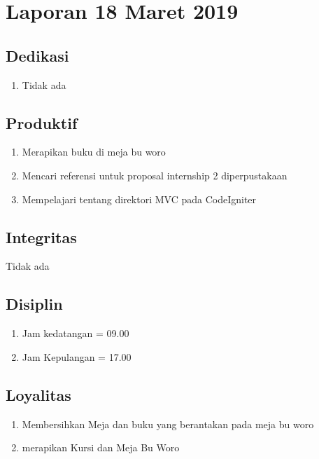 \section{Laporan 18 Maret 2019}
\subsection{Dedikasi}
\begin{enumerate}
\item Tidak ada
\end{enumerate}
\subsection{Produktif}
\begin{enumerate}
\item Merapikan buku di meja bu woro
\item Mencari referensi untuk proposal internship 2 diperpustakaan
\item Mempelajari tentang direktori MVC pada CodeIgniter
\end{enumerate}
\subsection{Integritas}
Tidak ada
\subsection{Disiplin}
\begin{enumerate}
\item Jam kedatangan =  09.00
\item Jam Kepulangan = 17.00
\end{enumerate}
\subsection{Loyalitas}
\begin{enumerate}
\item Membersihkan Meja dan buku yang berantakan pada meja bu woro
\item merapikan Kursi dan Meja Bu Woro
\end{enumerate}
